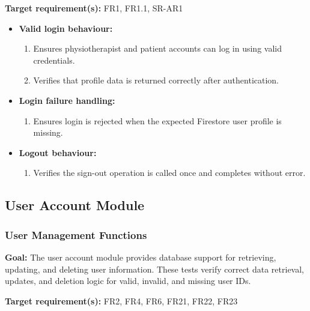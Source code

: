 \documentclass[12pt, titlepage]{article}
\begin{document}
\textbf{Target requirement(s):} FR1, FR1.1, SR-AR1

\begin{itemize}
    \item \textbf{Valid login behaviour:}
    \begin{enumerate}
        \item Ensures physiotherapist and patient accounts can log in using valid credentials.
        \item Verifies that profile data is returned correctly after authentication.
    \end{enumerate}

    \item \textbf{Login failure handling:}
    \begin{enumerate}
        \item Ensures login is rejected when the expected Firestore user profile is missing.
    \end{enumerate}

    \item \textbf{Logout behaviour:}
    \begin{enumerate}
        \item Verifies the sign-out operation is called once and completes without error.
    \end{enumerate}
\end{itemize}


\subsection{User Account Module}

\subsubsection{User Management Functions}

\textbf{Goal:} The user account module provides database support for retrieving, updating, and deleting user information. These tests verify correct data retrieval, updates, and deletion logic for valid, invalid, and missing user IDs.

\textbf{Target requirement(s):} FR2, FR4, FR6, FR21, FR22, FR23
\end{document}
